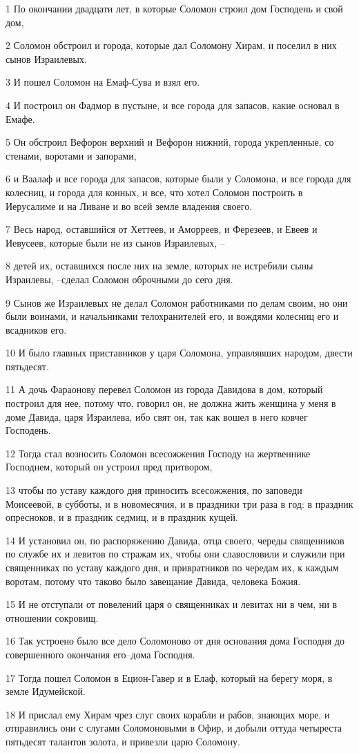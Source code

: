 \par 1 По окончании двадцати лет, в которые Соломон строил дом Господень и свой дом,
\par 2 Соломон обстроил и города, которые дал Соломону Хирам, и поселил в них сынов Израилевых.
\par 3 И пошел Соломон на Емаф-Сува и взял его.
\par 4 И построил он Фадмор в пустыне, и все города для запасов, какие основал в Емафе.
\par 5 Он обстроил Вефорон верхний и Вефорон нижний, города укрепленные, со стенами, воротами и запорами,
\par 6 и Ваалаф и все города для запасов, которые были у Соломона, и все города для колесниц, и города для конных, и все, что хотел Соломон построить в Иерусалиме и на Ливане и во всей земле владения своего.
\par 7 Весь народ, оставшийся от Хеттеев, и Аморреев, и Ферезеев, и Евеев и Иевусеев, которые были не из сынов Израилевых, --
\par 8 детей их, оставшихся после них на земле, которых не истребили сыны Израилевы, --сделал Соломон оброчными до сего дня.
\par 9 Сынов же Израилевых не делал Соломон работниками по делам своим, но они были воинами, и начальниками телохранителей его, и вождями колесниц его и всадников его.
\par 10 И было главных приставников у царя Соломона, управлявших народом, двести пятьдесят.
\par 11 А дочь Фараонову перевел Соломон из города Давидова в дом, который построил для нее, потому что, говорил он, не должна жить женщина у меня в доме Давида, царя Израилева, ибо свят он, так как вошел в него ковчег Господень.
\par 12 Тогда стал возносить Соломон всесожжения Господу на жертвеннике Господнем, который он устроил пред притвором,
\par 13 чтобы по уставу каждого дня приносить всесожжения, по заповеди Моисеевой, в субботы, и в новомесячия, и в праздники три раза в год: в праздник опресноков, и в праздник седмиц, и в праздник кущей.
\par 14 И установил он, по распоряжению Давида, отца своего, череды священников по службе их и левитов по стражам их, чтобы они славословили и служили при священниках по уставу каждого дня, и привратников по чередам их, к каждым воротам, потому что таково было завещание Давида, человека Божия.
\par 15 И не отступали от повелений царя о священниках и левитах ни в чем, ни в отношении сокровищ.
\par 16 Так устроено было все дело Соломоново от дня основания дома Господня до совершенного окончания его--дома Господня.
\par 17 Тогда пошел Соломон в Ецион-Гавер и в Елаф, который на берегу моря, в земле Идумейской.
\par 18 И прислал ему Хирам чрез слуг своих корабли и рабов, знающих море, и отправились они с слугами Соломоновыми в Офир, и добыли оттуда четыреста пятьдесят талантов золота, и привезли царю Соломону.


